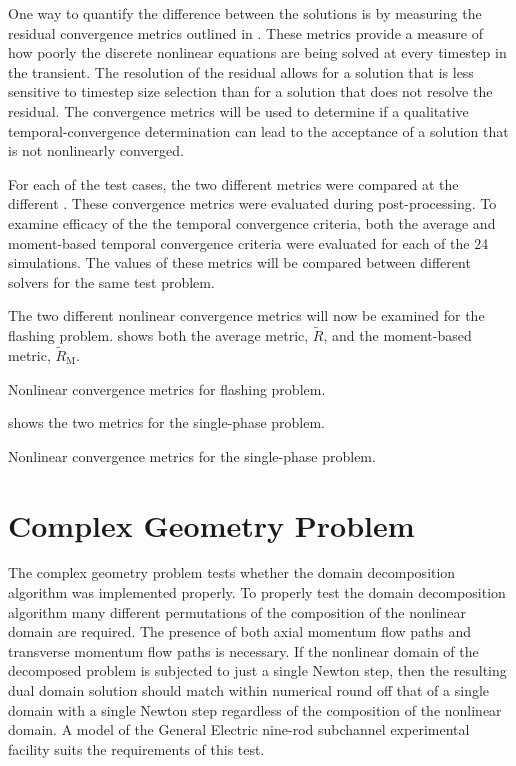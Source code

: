 One way to quantify the difference between the solutions is by measuring the residual convergence metrics outlined in .
These metrics provide a measure of how poorly the discrete nonlinear equations are being solved at every timestep in the transient.
The resolution of the residual allows for a solution that is less sensitive to timestep size selection than for a solution that does not resolve the residual.
The convergence metrics will be used to determine if a qualitative temporal-convergence determination can lead to the acceptance of a solution that is not nonlinearly converged.

For each of the test cases, the two different metrics were compared at the different \dtmax{}.
These convergence metrics were evaluated during post-processing.
To examine efficacy of the the temporal convergence criteria, both the average and moment-based temporal convergence criteria were evaluated for each of the 24 simulations.
The values of these metrics will be compared between different solvers for the same test problem. 

The two different nonlinear convergence metrics will now be examined for the flashing problem.
 shows both the average metric, $\tilde{R}$, and the moment-based metric, $\tilde{R}_{\text{M}}$.

\begin{table}[h!tb]
\centering
\singlespace

\caption{Nonlinear convergence metrics for flashing problem.}
\label{tab:flashingMetric}
\end{table}

 shows the two metrics for the single-phase problem.

\begin{table}[h!tb]
\centering
\singlespace

\caption{Nonlinear convergence metrics for the single-phase problem.}
\label{tab:singleMetric}
\end{table}

\section{Complex Geometry Problem}
\label{sect:complexProblem}
The complex geometry problem tests whether the domain decomposition algorithm was implemented properly.
To properly test the domain decomposition algorithm many different permutations of the composition of the nonlinear domain are required.
The presence of both axial momentum flow paths and transverse momentum flow paths is necessary.
If the nonlinear domain of the decomposed problem is subjected to just a single Newton step, then the resulting dual domain solution should match within numerical round off that of a single domain with a single Newton step regardless of the composition of the nonlinear domain.
A model of the General Electric nine-rod subchannel experimental facility \cite{Lahey1970} suits the requirements of this test.

